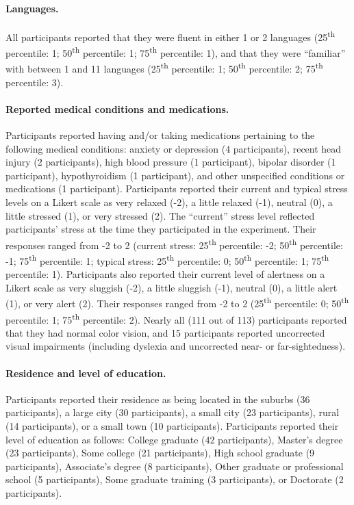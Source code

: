 \documentclass[10pt]{article}
\begin{document}
\paragraph{Languages.}
All participants reported that they were fluent in either 1 or 2
languages (25\textsuperscript{th} percentile: 1;
50\textsuperscript{th} percentile: 1; 75\textsuperscript{th}
percentile: 1), and that they were ``familiar'' with between 1 and 11
languages (25\textsuperscript{th} percentile: 1;
50\textsuperscript{th} percentile: 2; 75\textsuperscript{th}
percentile: 3).

\paragraph{Reported medical conditions and medications.}
Participants reported having and/or taking medications pertaining to the following medical conditions: anxiety or
depression (4 participants), recent head injury (2 participants), high
blood pressure (1 participant), bipolar disorder (1 participant),
hypothyroidism (1 participant), and other unspecified conditions or medications (1
participant).  Participants reported their current and typical stress
levels on a Likert scale as very relaxed (-2), a little relaxed (-1),
neutral (0), a little stressed (1), or very stressed (2).  The
``current'' stress level reflected participants' stress at the time
they participated in the experiment.
Their responses
ranged from -2 to 2 (current stress: 25\textsuperscript{th} percentile: -2;
50\textsuperscript{th} percentile: -1; 75\textsuperscript{th}
percentile: 1; typical stress: 25\textsuperscript{th} percentile: 0;
50\textsuperscript{th} percentile: 1; 75\textsuperscript{th}
percentile: 1).  Participants also reported their current level of
alertness on a Likert scale as very sluggish (-2), a little sluggish
(-1), neutral (0), a little alert (1), or very alert (2).  Their
responses ranged from -2 to 2 (25\textsuperscript{th} percentile: 0;
50\textsuperscript{th} percentile: 1; 75\textsuperscript{th}
percentile: 2).  Nearly all (111 out of 113) participants reported
that they had normal color vision, and 15 participants reported
uncorrected visual impairments (including dyslexia and uncorrected
near- or far-sightedness).

\paragraph{Residence and level of education.}
Participants reported their residence
as being located in the suburbs (36 participants), a large city (30
participants), a small city (23 participants), rural (14
participants), or a small town (10 participants).  Participants
reported their level of education as follows: College graduate (42
participants), Master's degree (23 participants), Some college (21
participants), High school graduate (9 participants), Associate's
degree (8 participants), Other graduate or professional school (5
participants), Some graduate training (3 participants), or Doctorate
(2 participants).
\end{document}
